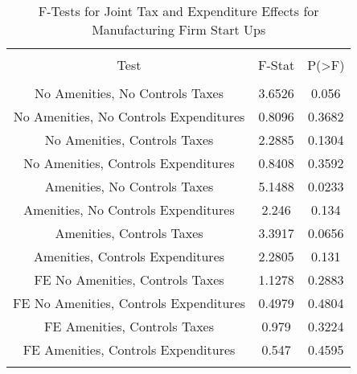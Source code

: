 
\begin{table}[!htbp] \centering 
  \caption{F-Tests for Joint Tax and Expenditure Effects for Manufacturing Firm Start Ups} 
  \label{31-33Ftests} 
\begin{tabular}{@{\extracolsep{5pt}} ccc} 
\\[-1.8ex]\hline 
\hline \\[-1.8ex] 
Test & F-Stat & P(\textgreater F) \\ 
\hline \\[-1.8ex] 
No Amenities, No Controls Taxes & 3.6526 & 0.056 \\ 
No Amenities, No Controls Expenditures & 0.8096 & 0.3682 \\ 
No Amenities, Controls Taxes & 2.2885 & 0.1304 \\ 
No Amenities, Controls Expenditures & 0.8408 & 0.3592 \\ 
Amenities, No Controls Taxes & 5.1488 & 0.0233 \\ 
Amenities, No Controls Expenditures & 2.246 & 0.134 \\ 
Amenities, Controls Taxes & 3.3917 & 0.0656 \\ 
Amenities, Controls Expenditures & 2.2805 & 0.131 \\ 
FE No Amenities, Controls Taxes & 1.1278 & 0.2883 \\ 
FE No Amenities, Controls Expenditures & 0.4979 & 0.4804 \\ 
FE Amenities, Controls Taxes & 0.979 & 0.3224 \\ 
FE Amenities, Controls Expenditures & 0.547 & 0.4595 \\ 
\hline \\[-1.8ex] 
\end{tabular} 
\end{table} 
